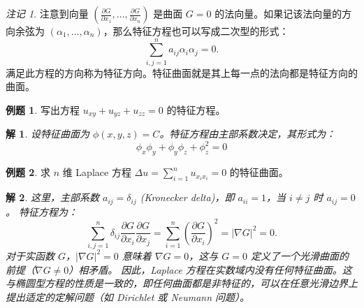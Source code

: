 \documentclass[12pt,a4paper]{article}
\numberwithin{subsection}{section}
\numberwithin{subsubsection}{subsection}
\theoremstyle{plain}
\newtheorem{solution}{解}[subsection]
\theoremstyle{definition}
\newtheorem{example}{例题}[subsection]
\theoremstyle{remark}
\newtheorem{remark}[theorem]{注记}
\begin{document}
	\begin{remark}
		注意到向量 \((\frac{\partial G}{\partial x_1}, \dots, \frac{\partial G}{\partial x_n})\) 是曲面 \(G=0\) 的法向量。如果记该法向量的方向余弦为 \((\alpha_1, \dots, \alpha_n)\)，那么特征方程也可以写成二次型的形式：
		\[
		\sum_{i,j=1}^{n} a_{ij} \alpha_i \alpha_j = 0.
		\]
		满足此方程的方向称为特征方向。特征曲面就是其上每一点的法向都是特征方向的曲面。
	\end{remark}
	
	
		\begin{example}
		写出方程 $u_{xy} + u_{yz} + u_{zz} = 0$ 的特征方程。
	\end{example}
	\begin{solution}
		设特征曲面为 $\phi(x, y, z) = C$。特征方程由主部系数决定，其形式为：
		\[
		\phi_x \phi_y + \phi_y \phi_z + \phi_z^2 = 0
		\]
	\end{solution}
	
	
	\begin{example}
		求 \(n\) 维 Laplace 方程 \(\Delta u = \sum_{i=1}^n u_{x_ix_i} = 0\) 的特征曲面。
	\end{example}
	\begin{solution}
		这里，主部系数 \(a_{ij} = \delta_{ij}\) (Kronecker delta)，即 \(a_{ii}=1\)，当 \(i \neq j\) 时 \(a_{ij}=0\)。
		特征方程为：
		\[
		\sum_{i,j=1}^{n} \delta_{ij} \frac{\partial G}{\partial x_i} \frac{\partial G}{\partial x_j} = \sum_{i=1}^{n} \left(\frac{\partial G}{\partial x_i}\right)^2 = |\nabla G|^2 = 0.
		\]
		对于实函数 \(G\)，\(|\nabla G|^2=0\) 意味着 \(\nabla G = 0\)，这与 \(G=0\) 定义了一个光滑曲面的前提（\(\nabla G \neq 0\)）相矛盾。
		因此，Laplace 方程在实数域内没有任何特征曲面。这与椭圆型方程的性质是一致的，即任何曲面都是非特征的，可以在任意光滑边界上提出适定的定解问题（如 Dirichlet 或 Neumann 问题）。
	\end{solution}
	
	
	
	
	
	
\end{document}
